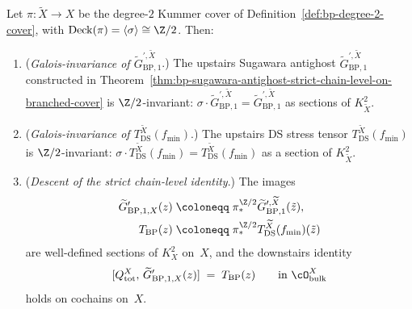\begin{theorem}
\label{thm:bp-galois-descent}
\ClaimStatusProvedHere
Let $\pi \colon \widetilde X \to X$ be the degree-$2$ Kummer cover
of Definition~\ref{def:bp-degree-2-cover}, with
$\mathrm{Deck}(\pi) = \langle \sigma \rangle \cong \Z/2$. Then:
\begin{enumerate}[label=\textup{(\alph*)},nosep]
\item (\emph{Galois-invariance of $\widetilde G^{\prime, \widetilde X}_{\mathrm{BP}, 1}$}.)
 The upstairs Sugawara antighost
 $\widetilde G^{\prime, \widetilde X}_{\mathrm{BP}, 1}$ constructed
 in Theorem~\ref{thm:bp-sugawara-antighost-strict-chain-level-on-branched-cover}
 is $\Z/2$-invariant:
 $\sigma \cdot \widetilde G^{\prime, \widetilde X}_{\mathrm{BP}, 1}
 = \widetilde G^{\prime, \widetilde X}_{\mathrm{BP}, 1}$ as
 sections of $K_{\widetilde X}^{2}$.
\item (\emph{Galois-invariance of $T_{\mathrm{DS}}^{\widetilde X}(f_{\min})$}.)
 The upstairs DS stress tensor
 $T_{\mathrm{DS}}^{\widetilde X}(f_{\min})$ is $\Z/2$-invariant:
 $\sigma \cdot T_{\mathrm{DS}}^{\widetilde X}(f_{\min})
 = T_{\mathrm{DS}}^{\widetilde X}(f_{\min})$ as a section of
 $K_{\widetilde X}^{2}$.
\item (\emph{Descent of the strict chain-level identity}.) The
 images
 \begin{align}
 \widetilde G^{\prime}_{\mathrm{BP}, 1, X}(z)
 &\;\coloneqq\; \pi_{\ast}^{\Z/2}
 \widetilde G^{\prime, \widetilde X}_{\mathrm{BP}, 1}(\tilde z),
 \label{eq:bp-tilde-G-prime-downstairs}\\
 T_{\mathrm{BP}}(z)
 &\;\coloneqq\; \pi_{\ast}^{\Z/2}
 T_{\mathrm{DS}}^{\widetilde X}(f_{\min})(\tilde z)
 \label{eq:bp-T-BP-downstairs}
 \end{align}
 are well-defined sections of $K_{X}^{2}$ on~$X$, and the
 downstairs identity
 \begin{equation}\label{eq:bp-strict-chain-downstairs}
 [Q_{\mathrm{tot}}^{X},\,
 \widetilde G^{\prime}_{\mathrm{BP}, 1, X}(z)]
 \;=\; T_{\mathrm{BP}}(z)
 \qquad \text{in $\cO_{\mathrm{bulk}}^{X}$}
 \end{equation}
 holds on cochains on~$X$.
\end{enumerate}
\end{theorem}

